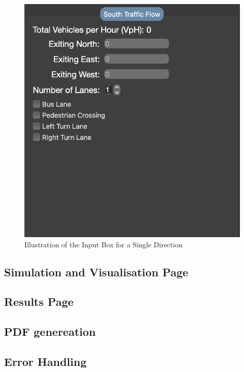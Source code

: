 \documentclass{article}
\begin{document}
        \begin{figure}[H]
            \centering
            \includegraphics[width=\textwidth]{inputBox.png}
            \caption{Illustration of the Input Box for a Single Direction}
            \label{fig:inputBox}
        \end{figure}

    \subsection{Simulation and Visualisation Page}

    \subsection{Results Page}

    \subsection{PDF genereation}

    \subsection{Error Handling}
\end{document}
